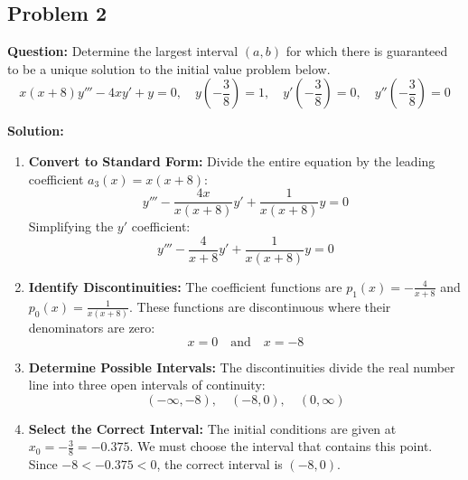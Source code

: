 \documentclass[11pt, a4paper]{article}
\theoremstyle{definition}
\theoremstyle{remark}
\begin{document}
\vspace{1em}
\subsection{Problem 2}
\textbf{Question:} Determine the largest interval $(a,b)$ for which there is guaranteed to be a unique solution to the initial value problem below.
\[ x(x+8)y''' - 4xy' + y = 0, \quad y\left(-\frac{3}{8}\right) = 1, \quad y'\left(-\frac{3}{8}\right) = 0, \quad y''\left(-\frac{3}{8}\right) = 0 \]

\textbf{Solution:}
\begin{enumerate}
    \item \textbf{Convert to Standard Form:} Divide the entire equation by the leading coefficient $a_3(x) = x(x+8)$:
    \[ y''' - \frac{4x}{x(x+8)}y' + \frac{1}{x(x+8)}y = 0 \]
    Simplifying the $y'$ coefficient:
    \[ y''' - \frac{4}{x+8}y' + \frac{1}{x(x+8)}y = 0 \]
    \item \textbf{Identify Discontinuities:} The coefficient functions are $p_1(x) = -\frac{4}{x+8}$ and $p_0(x) = \frac{1}{x(x+8)}$. These functions are discontinuous where their denominators are zero:
    \[ x = 0 \quad \text{and} \quad x = -8 \]
    \item \textbf{Determine Possible Intervals:} The discontinuities divide the real number line into three open intervals of continuity:
    \[ (-\infty, -8), \quad (-8, 0), \quad (0, \infty) \]
    \item \textbf{Select the Correct Interval:} The initial conditions are given at $x_0 = -\frac{3}{8} = -0.375$. We must choose the interval that contains this point. Since $-8 < -0.375 < 0$, the correct interval is $(-8, 0)$.
\end{enumerate}

\begin{center}
\end{center}
\end{document}
